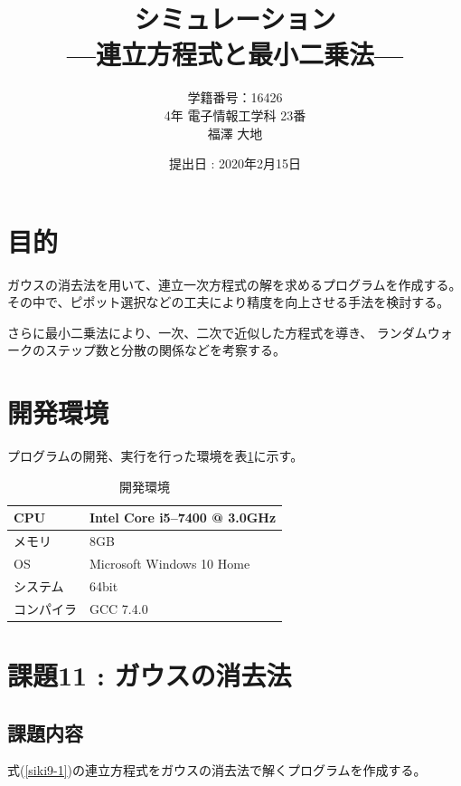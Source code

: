 \documentclass[a4j,titlepage]{jsarticle}
\begin{document}
\begin{titlepage}
  \title{\huge{シミュレーション} \\ \LARGE{---連立方程式と最小二乗法---}}
	\author{学籍番号：16426 \\ 4年 電子情報工学科 23番 \\ 福澤 大地}
	\date{提出日 : 2020年2月15日}
  \maketitle
\end{titlepage}


\section{目的}
ガウスの消去法を用いて、連立一次方程式の解を求めるプログラムを作成する。
その中で、ピポット選択などの工夫により精度を向上させる手法を検討する。

さらに最小二乗法により、一次、二次で近似した方程式を導き、
ランダムウォークのステップ数と分散の関係などを考察する。


\section{開発環境}
プログラムの開発、実行を行った環境を表\ref{tb:kan}に示す。

\begin{table}[H]
  \centering
  \caption{開発環境}
  \label{tb:kan}

  \begin{tabular}{|l|l|}
    \hline
    CPU & Intel Core i5--7400 @ 3.0GHz \\ \hline
    メモリ & 8GB \\ \hline
    OS & Microsoft Windows 10 Home \\ \hline
    システム & 64bit \\ \hline
    コンパイラ & GCC 7.4.0 \\ \hline
  \end{tabular}
\end{table}


\section{課題11 : ガウスの消去法}
\subsection{課題内容}
式(\ref{siki9-1})の連立方程式をガウスの消去法で解くプログラムを作成する。
\end{document}
